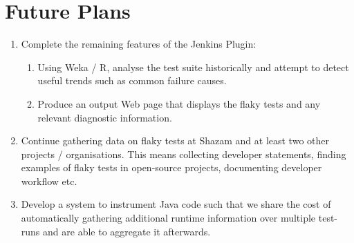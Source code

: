 \newpage

\section{Future Plans}

\begin{enumerate}
	\item{
		Complete the remaining features of the Jenkins Plugin:
	}
	\begin{enumerate}
		\item{
			Using Weka / R, analyse the test suite historically and attempt to detect useful trends such as common failure causes.
		}
		\item{
			Produce an output Web page that displays the flaky tests and any relevant diagnostic information.
		}
	\end{enumerate}
	\item{
		Continue gathering data on flaky tests at Shazam and at least two other projects / organisations. This means collecting developer statements, finding examples of flaky tests in open-source projects, documenting developer workflow etc.
	}
	\item{
		Develop a system to instrument Java code such that we share the cost of automatically gathering additional runtime information over multiple test-runs and are able to aggregate it afterwards.
	}
\end{enumerate}

\newpage

\setcounter{section}{\value{oldSectionCounter}}
\setcounter{page}{\value{oldPageCounter}}
